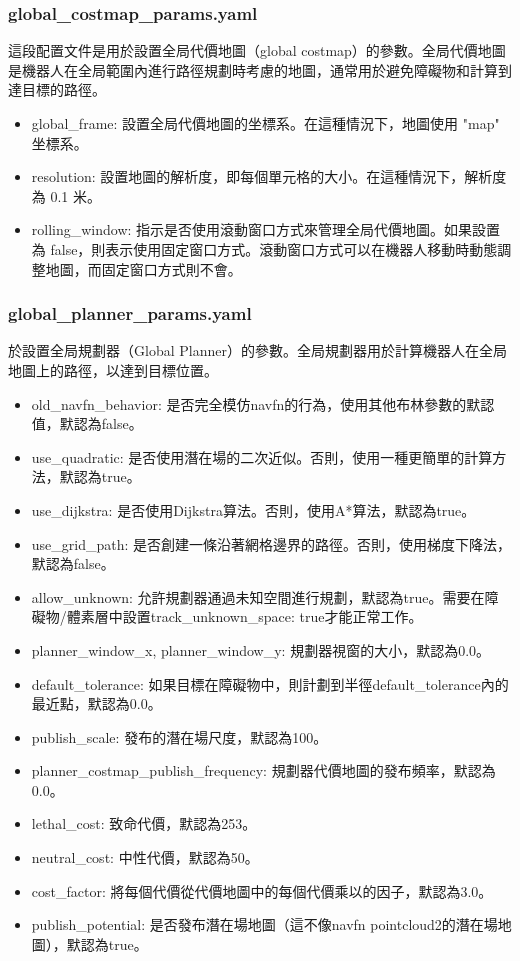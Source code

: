 \subsubsection{global\_costmap\_params.yaml}
這段配置文件是用於設置全局代價地圖（global costmap）的參數。全局代價地圖是機器人在全局範圍內進行路徑規劃時考慮的地圖，通常用於避免障礙物和計算到達目標的路徑。

\begin{itemize}
    \item global\_frame: 設置全局代價地圖的坐標系。在這種情況下，地圖使用 "map" 坐標系。
    \item resolution: 設置地圖的解析度，即每個單元格的大小。在這種情況下，解析度為 0.1 米。
    \item rolling\_window: 指示是否使用滾動窗口方式來管理全局代價地圖。如果設置為 false，則表示使用固定窗口方式。滾動窗口方式可以在機器人移動時動態調整地圖，而固定窗口方式則不會。
\end{itemize}

\subsubsection{global\_planner\_params.yaml}

於設置全局規劃器（Global Planner）的參數。全局規劃器用於計算機器人在全局地圖上的路徑，以達到目標位置。
\begin{itemize}
    \item old\_navfn\_behavior: 是否完全模仿navfn的行為，使用其他布林參數的默認值，默認為false。
    \item use\_quadratic: 是否使用潛在場的二次近似。否則，使用一種更簡單的計算方法，默認為true。
    \item use\_dijkstra: 是否使用Dijkstra算法。否則，使用A*算法，默認為true。
    \item use\_grid\_path: 是否創建一條沿著網格邊界的路徑。否則，使用梯度下降法，默認為false。
    \item allow\_unknown: 允許規劃器通過未知空間進行規劃，默認為true。需要在障礙物/體素層中設置track\_unknown\_space: true才能正常工作。
    \item planner\_window\_x, planner\_window\_y: 規劃器視窗的大小，默認為0.0。
    \item default\_tolerance: 如果目標在障礙物中，則計劃到半徑default\_tolerance內的最近點，默認為0.0。
    \item publish\_scale: 發布的潛在場尺度，默認為100。
    \item planner\_costmap\_publish\_frequency: 規劃器代價地圖的發布頻率，默認為0.0。
    \item lethal\_cost: 致命代價，默認為253。
    \item neutral\_cost: 中性代價，默認為50。
    \item cost\_factor: 將每個代價從代價地圖中的每個代價乘以的因子，默認為3.0。
    \item publish\_potential: 是否發布潛在場地圖（這不像navfn pointcloud2的潛在場地圖），默認為true。
\end{itemize}

